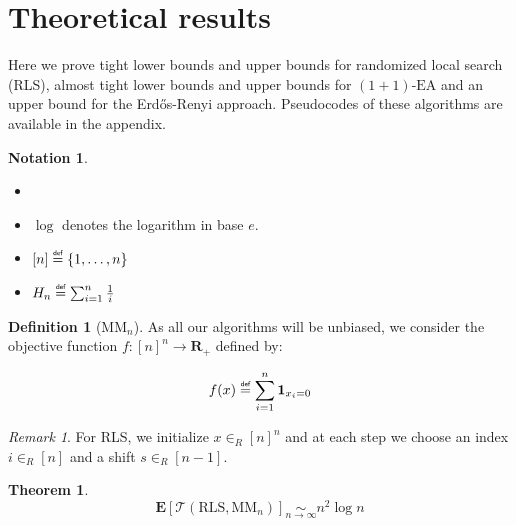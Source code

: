 \documentclass[12pt]{article}
\theoremstyle{definition}
\newtheorem*{definition}{Definition}
\newtheorem*{notation}{Notation}
\theoremstyle{plain}
\newtheorem*{theorem}{Theorem}
\theoremstyle{remark}
\newtheorem*{remark}{Remark}
\newcommand{\myequiv}[1]{\underset{#1}{\sim}}
\newcommand\mydef{\mathrel{\overset{\makebox[0pt]{\mbox{\normalfont\tiny\sffamily def}}}{=}}}
\begin{document}
\section{Theoretical results}

Here we prove tight lower bounds and upper bounds for randomized local search (RLS), 
almost tight lower bounds and upper bounds for $(1+1)\text{-EA}$ and an upper bound
for the Erd\H{o}s-Renyi approach. Pseudocodes of these algorithms are available in
the appendix.

\begin{notation}
    \begin{itemize}
        \item[]
        \item $\log$ denotes the logarithm in base $e$.
        \item $[n]\mydef \{1,\ldots,n\}$
        \item $H_n\mydef \sum_{i=1}^n \frac{1}{i}$
    \end{itemize}
\end{notation}

\begin{definition}[$\text{MM}_n$]
    As all our algorithms will be unbiased, we consider the objective function $f:[n]^n\to \mathbf{R}_+$ defined by:

    $$f(x)\mydef \sum_{i=1}^{n} \mathbf{1}_{x_i=0}$$
\end{definition}

\begin{remark}
    For RLS, we initialize $x\in_R [n]^n$ and at each step we choose an index
    $i\in_R [n]$ and a shift $s\in_R [n-1]$.
\end{remark}


\begin{theorem}
    $$\mathbf{E}[\mathcal{T}(\text{RLS},\text{MM}_n)]\myequiv{n\to\infty} n^2 \log n$$
\end{theorem}
\end{document}
